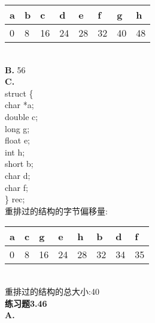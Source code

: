 \documentclass{article}
\begin{document}
\begin{CJK}{UTF8}{uyhei}
\renewcommand\arraystretch{1.4}
\begin{table}[htbp]
\centering
\begin{tabular}{|m{6em}<{\centering}|m{6em}<{\centering}|m{6em}<{\centering}|m{6em}<{\centering}|m{6em}<{\centering}|m{6em}<{\centering}|m{6em}<{\centering}|m{6em}<{\centering}|}
\hline
a	&	b	&	c	&	d	&	e	&	f	&	g	&	h	\\
\hline
0	&	8	&	16	&	24	&	28	&	32	&	40	&	48	\\
\hline
\end{tabular}
\end{table}	\\[2ex]
\textbf{B.} 56	\\[1ex]
\textbf{C.}	\\
struct \{	\\
	\hspace*{2em}char *a;	\\
	\hspace*{2em}double c;	\\
	\hspace*{2em}long g;	\\
	\hspace*{2em}float e;	\\
	\hspace*{2em}int h;	\\
	\hspace*{2em}short b;	\\
	\hspace*{2em}char d;	\\
	\hspace*{2em}char f;	\\
\} rec;	\\[4ex]
重排过的结构的字节偏移量:	\\[-3ex]
\renewcommand\arraystretch{1.4}
\begin{table}[htbp]
\centering
\begin{tabular}{|m{6em}<{\centering}|m{6em}<{\centering}|m{6em}<{\centering}|m{6em}<{\centering}|m{6em}<{\centering}|m{6em}<{\centering}|m{6em}<{\centering}|m{6em}<{\centering}|}
\hline
a	&	c	&	g	&	e	&	h	&	b	&	d	&	f	\\
\hline
0	&	8	&	16	&	24	&	28	&	32	&	34	&	35	\\
\hline
\end{tabular}
\end{table}	\\[2ex]
重排过的结构的总大小:40	\\[3ex]
\textbf{练习题3.46}	\\
\textbf{A.}	\\[-2ex]

\end{CJK}
\end{document}
